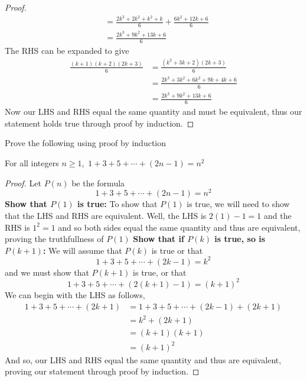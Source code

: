 \documentclass[addpoints]{exam}
\begin{document}
\begin{questions}
\begin{solution}[\stretch{1}]
\begin{proof}
\begin{align*}
          &= \frac{2k^3 + 2k^2 + k^2 + k}{6} + \frac{6k^2 + 12k + 6}{6} \\ 
          &= \frac{2k^3 + 9k^2 + 13k + 6}{6}
        \end{align*}
        The RHS can be expanded to give
        \begin{align*}
          \frac{(k+1)(k+2)(2k+3)}{6} &= \frac{(k^2 + 3k + 2)(2k+3)}{6} \\ 
          &= \frac{2k^3 + 3k^2 + 6k^2 + 9k + 4k + 6}{6} \\ 
          &= \frac{2k^3 + 9k^2 + 13k + 6}{6}
        \end{align*}
        Now our LHS and RHS equal the same quantity and must be equivalent, thus our statement holds true through proof by induction.
      \end{proof}
    \end{solution}

    \newpage

    \question Prove the following using proof by induction
    \begin{center}
      For all integers $n \geq 1$, $\displaystyle\, 1 + 3 + 5 + \cdots + (2n-1) = n^2$
    \end{center}
    \begin{solution}[\stretch{1}]
      \begin{proof}
        Let $P(n)$ be the formula 
        \[
        1 + 3 + 5 + \cdots + (2n-1) = n^2
        \]
        \textbf{Show that $P(1)$ is true:} To show that $P(1)$ is true, we will need to show that the LHS and RHS are equivalent. Well, the LHS is $2(1)-1=1$ and the RHS is $1^2=1$ and so both sides equal the same quantity and thus are equivalent, proving the truthfullness of $P(1)$ 
        \newline\textbf{Show that if $P(k)$ is true, so is $P(k+1)$:} We will assume that $P(k)$ is true or that 
        \[
        1 + 3 + 5 + \cdots + (2k-1) = k^2
        \]
        and we must show that $P(k+1)$ is true, or that 
        \[
        1 + 3 + 5 + \cdots + \left(2\left(k+1\right)-1\right) = \left(k+1\right)^2
        \]
        We can begin with the LHS as follows, 
        \begin{align*}
          1 + 3 + 5 + \cdots + (2k + 1) &= 1 + 3 + 5 + \cdots + (2k - 1) + (2k + 1) \\ 
          &= k^2 + (2k + 1) \\ 
          &= (k+1)(k+1) \\ 
          &= \left(k+1\right)^2 
        \end{align*}
        And so, our LHS and RHS equal the same quantity and thus are equivalent, proving our statement through proof by induction.
      \end{proof}
    \end{solution}


\end{questions}
\end{document}
